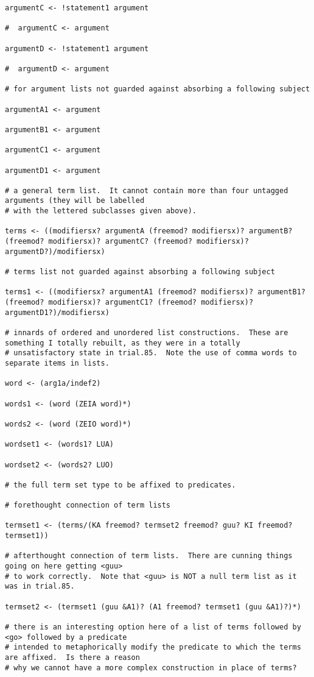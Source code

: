 \documentclass{article}
\begin{document}
\begin{verbatim}
argumentC <- !statement1 argument 

#  argumentC <- argument

argumentD <- !statement1 argument 

#  argumentD <- argument

# for argument lists not guarded against absorbing a following subject

argumentA1 <- argument

argumentB1 <- argument

argumentC1 <- argument

argumentD1 <- argument

# a general term list.  It cannot contain more than four untagged arguments (they will be labelled
# with the lettered subclasses given above).

terms <- ((modifiersx? argumentA (freemod? modifiersx)? argumentB? (freemod? modifiersx)? argumentC? (freemod? modifiersx)? argumentD?)/modifiersx)

# terms list not guarded against absorbing a following subject

terms1 <- ((modifiersx? argumentA1 (freemod? modifiersx)? argumentB1? (freemod? modifiersx)? argumentC1? (freemod? modifiersx)? argumentD1?)/modifiersx)

# innards of ordered and unordered list constructions.  These are something I totally rebuilt, as they were in a totally
# unsatisfactory state in trial.85.  Note the use of comma words to separate items in lists.

word <- (arg1a/indef2)

words1 <- (word (ZEIA word)*)

words2 <- (word (ZEIO word)*)

wordset1 <- (words1? LUA)

wordset2 <- (words2? LUO)

# the full term set type to be affixed to predicates.

# forethought connection of term lists

termset1 <- (terms/(KA freemod? termset2 freemod? guu? KI freemod? termset1))

# afterthought connection of term lists.  There are cunning things going on here getting <guu>
# to work correctly.  Note that <guu> is NOT a null term list as it was in trial.85.

termset2 <- (termset1 (guu &A1)? (A1 freemod? termset1 (guu &A1)?)*)

# there is an interesting option here of a list of terms followed by <go> followed by a predicate
# intended to metaphorically modify the predicate to which the terms are affixed.  Is there a reason
# why we cannot have a more complex construction in place of terms?


\end{verbatim}
\end{document}
